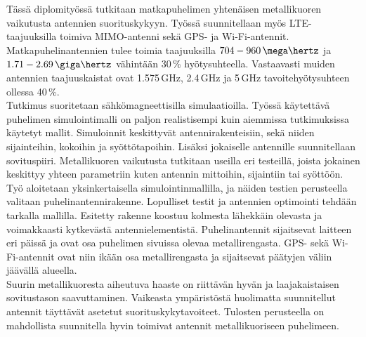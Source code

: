 Tässä diplomityössä tutkitaan matkapuhelimen yhtenäisen metallikuoren vaikutusta antennien suorituskykyyn. Työssä suunnitellaan myös LTE-taajuuksilla toimiva MIMO-antenni sekä GPS- ja Wi-Fi-antennit. Matkapuhelinantennien tulee toimia taajuuksilla $704-960\,\mega\hertz$ ja $1.71-2.69\,\giga\hertz$ vähintään 30\,\% hyötysuhteella. Vastaavasti muiden antennien taajuuskaistat ovat 1.575\,GHz, 2.4\,GHz ja 5\,GHz tavoitehyötysuhteen ollessa 40\,\%. \\

Tutkimus suoritetaan sähkömagneettisilla simulaatioilla. Työssä käytettävä puhelimen simulointimalli on paljon realistisempi kuin aiemmissa tutkimuksissa käytetyt mallit. Simuloinnit keskittyvät antennirakenteisiin, sekä niiden sijainteihin, kokoihin ja syöttötapoihin. Lisäksi jokaiselle antennille suunnitellaan sovituspiiri. Metallikuoren vaikutusta tutkitaan useilla eri testeillä, joista jokainen keskittyy yhteen parametriin kuten antennin mittoihin, sijaintiin tai syöttöön. \\

Työ aloitetaan yksinkertaisella simulointinmallilla, ja näiden testien perusteella valitaan puhelinantennirakenne. Lopulliset testit ja antennien optimointi tehdään tarkalla mallilla. Esitetty rakenne koostuu kolmesta lähekkäin olevasta ja voi\-mak\-kaas\-ti kytkevästä antennielementistä. Puhelinantennit sijaitsevat laitteen eri päissä ja ovat osa puhelimen sivuissa olevaa metallirengasta. GPS- sekä Wi-Fi-antennit ovat niin ikään osa metallirengasta ja sijaitsevat päätyjen väliin jäävällä alueella. \\

Suurin me\-tal\-li\-kuo\-res\-ta aiheutuva haaste on riittävän hyvän ja laajakaistaisen sovitustason saavuttaminen. Vaikeasta ympäristöstä huolimatta suun\-ni\-tel\-lut antennit täyttävät asetetut suorituskykytavoiteet. Tulosten perusteella on mahdollista suun\-ni\-tel\-la hyvin toimivat antennit metallikuoriseen puhelimeen.

